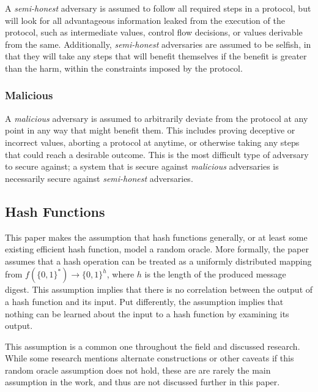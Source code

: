 A \emph{semi-honest} adversary is assumed to follow all required steps in a protocol, but will look for all advantageous information leaked from the execution of the protocol, such as intermediate values, control flow decisions, or values derivable from the same\cite{goldreich1998secure}.  Additionally, \emph{semi-honest} adversaries are assumed to be selfish, in that they will take any steps that will benefit themselves if the benefit is greater than the harm, within the constraints imposed by the protocol.


\subsubsection{Malicious}

A \emph{malicious} adversary is assumed to arbitrarily deviate from the protocol at any point in any way that might benefit them\cite{goldreich1998secure}.  This includes proving deceptive or incorrect values, aborting a protocol at anytime, or otherwise taking any steps that could reach a desirable outcome.  This is the most difficult type of adversary to secure against; a system that is secure against \emph{malicious} adversaries is necessarily secure against \emph{semi-honest} adversaries.


\subsection{Hash Functions}

This paper makes the assumption that hash functions generally, or at least some existing efficient hash function, model a random oracle.  More formally, the paper assumes that a hash operation can be treated as a uniformly distributed mapping from $f(\{0, 1\}^{*}) \to \{0, 1\}^{h}$, where $h$ is the length of the produced message digest.  This assumption implies that there is no correlation between the output of a hash function and its input.  Put differently, the assumption implies that nothing can be learned about the input to a hash function by examining its output.

This assumption is a common one throughout the field and discussed research\cite{pinkas2009secure}.  While some research mentions alternate constructions or other caveats if this random oracle assumption does not hold, these are are rarely the main assumption in the work, and thus are not discussed further in this paper.
